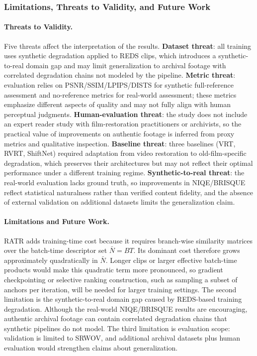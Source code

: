 \subsubsection{Limitations, Threats to Validity, and Future Work}
\label{subsec:limitations}

\paragraph{Threats to Validity.}
Five threats affect the interpretation of the results. \textbf{Dataset threat}: all training uses synthetic degradation applied to REDS clips, which introduces a synthetic-to-real domain gap and may limit generalization to archival footage with correlated degradation chains not modeled by the pipeline. \textbf{Metric threat}: evaluation relies on PSNR/SSIM/LPIPS/DISTS for synthetic full-reference assessment and no-reference metrics for real-world assessment; these metrics emphasize different aspects of quality and may not fully align with human perceptual judgments. \textbf{Human-evaluation threat}: the study does not include an expert reader study with film-restoration practitioners or archivists, so the practical value of improvements on authentic footage is inferred from proxy metrics and qualitative inspection. \textbf{Baseline threat}: three baselines (VRT, RVRT, ShiftNet) required adaptation from video restoration to old-film-specific degradation, which preserves their architectures but may not reflect their optimal performance under a different training regime. \textbf{Synthetic-to-real threat}: the real-world evaluation lacks ground truth, so improvements in NIQE/BRISQUE reflect statistical naturalness rather than verified content fidelity, and the absence of external validation on additional datasets limits the generalization claim.

\paragraph{Limitations and Future Work.}
RATR adds training-time cost because it requires branch-wise similarity matrices over the batch-time descriptor set $\bar{N}=BT$. Its dominant cost therefore grows approximately quadratically in $\bar{N}$. Longer clips or larger effective batch-time products would make this quadratic term more pronounced, so gradient checkpointing or selective ranking construction, such as sampling a subset of anchors per iteration, will be needed for larger training settings. The second limitation is the synthetic-to-real domain gap caused by REDS-based training degradation. Although the real-world NIQE/BRISQUE results are encouraging, authentic archival footage can contain correlated degradation chains that synthetic pipelines do not model. The third limitation is evaluation scope: validation is limited to SRWOV, and additional archival datasets plus human evaluation would strengthen claims about generalization.

